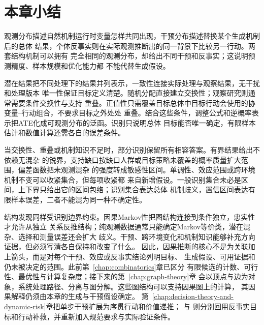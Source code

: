 \section{本章小结}
\label{sec:causal-inference-summary}

观测分布描述自然机制运行时变量怎样共同出现，干预分布描述替换某个生成机制后的总体
结果，个体反事实则在实际观测推断出的同一背景下比较另一行动。两套结构机制可以拥有
完全相同的观测分布，却给出不同干预和反事实；这说明预测精度、样本规模和优化能力都
不能代替生成假设。

潜在结果把不同处理下的结果并列表示，一致性连接实际处理与观察结果，无干扰和处理版本
唯一性保证目标定义清楚。随机分配直接建立交换性；观察研究则通常需要条件交换性与支持
重叠。正值性只需覆盖目标总体中目标行动会使用的协变量--行动组合，不要求目标之外处处
重叠。结合这些条件，调整公式和逆概率表示把ATE化成可观测分布的泛函。识别只说明总体
目标能否唯一确定，有限样本估计和数值计算还需各自的误差条件。

当交换性、重叠或机制知识不足时，部分识别保留所有相容答案。有界结果给出不依赖无混杂
的锐界，支持缺口按缺口人群或目标策略未覆盖的概率质量扩大范围，偏差函数把未观测混杂
的强度转成敏感性区间。单调性、效应范围或跨环境机制不变可以收紧集合，但每项收紧都
来自新增假设。一般识别集合未必是区间，上下界只给出它的区间包络；识别集合表达总体
机制歧义，置信区间表达有限样本误差，二者不能混为同一种不确定性。

结构发现同样受识别边界约束。因果Markov性把图结构连接到条件独立，忠实性才允许从独立
关系反推结构；纯观测数据通常只能确定Markov等价类，潜在混杂、选择和测量误差还会扩大
歧义。干预、跨环境变化和机制知识能够补充方向证据，但必须写清各自保持和改变了什么。
因此，因果推断的核心不是为关联加上箭头，而是对每个干预、效应或反事实结论列明目标、
生成假设、可用证据和仍未被决定的范围。此前第~\ref{chap:combinatorics}章已区分
有限候选的计数、可行性、最优性与计算复杂度；接下来的第~\ref{chap:graph-theory}章
会以顶点与边为对象，系统处理路径、分离与图分解。这些图结构可以支持因果图上的计算，
其因果解释仍须由本章的生成与干预假设确定。
第~\ref{chap:decision-theory-and-dynamic-risk}章把单步干预扩展为序贯行动和价值递推；
与
则分别回用反事实目标和行动补救，并重新加入规范要求与实际验证条件。
